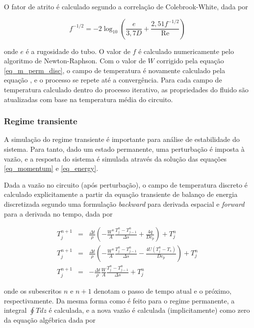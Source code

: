 \documentclass[a4paper,portuguese,10pt]{article}
\renewcommand{\Re}{\operatorname{Re}}
\begin{document}
O fator de atrito é calculado segundo a correlação de Colebrook-White, dada por

\begin{equation}
  f^{-1/2} = -2\log_{10}\left(\frac{e}{3,7D}+\frac{2,51f^{-1/2}}{\Re}\right)
\end{equation}

onde $e$ é a rugosidade do tubo. O valor de $f$ é calculado numericamente pelo algoritmo de Newton-Raphson. Com o valor de $W$ corrigido pela equação \ref{eq_m_perm_disc}, o campo de temperatura é novamente calculado pela equação \label{eq_e_perm_disc}, e o processo se repete até a convergência. Para cada campo de temperatura calculado dentro do processo iterativo, as propriedades do fluido são atualizadas com base na temperatura média do circuito.

\subsubsection{Regime transiente}

A simulação do regime transiente é importante para análise de estabilidade do sistema. Para tanto, dado um estado permanente, uma perturbação é imposta à vazão, e a resposta do sistema é simulada através da solução das equações \ref{eq_momentum} e \ref{eq_energy}.

Dada a vazão no circuito (após perturbação), o campo de temperatura discreto é calculado explicitamente a partir da equação transiente de balanço de energia discretizada segundo uma formulação {\it backward} para derivada espacial e {\it forward} para a derivada no tempo, dada por

\begin{subequations}
\begin{eqnarray}
  T_j^{n+1} &=& \frac{\Delta t}{\rho}\left(-\frac{W^n}{A}\frac{T_j^n-T_{j-1}^n}{\Delta s} + \frac{4q}{Dc_p}\right) + T_j^n\\
  T_j^{n+1} &=& \frac{\Delta t}{\rho}\left(-\frac{W^n}{A}\frac{T_j^n-T_{j-1}^n}{\Delta s} - \frac{4U(T_j^n-T_s)}{Dc_p}\right) + T_j^n\\
  T_j^{n+1} &=& -\frac{\Delta t}{\rho}\frac{W}{A}\frac{T_j^n-T_{j-1}^n}{\Delta s} + T_j^n
\label{eq_e_tran_disc}
\end{eqnarray}
\end{subequations}

onde os subescritos $n$ e $n+1$ denotam o passo de tempo atual e o próximo, respectivamente. Da mesma forma como é feito para o regime permanente, a integral $\oint Tdz$ é calculada, e a nova vazão é calculada (implicitamente) como zero da equação algébrica dada por
\end{document}
